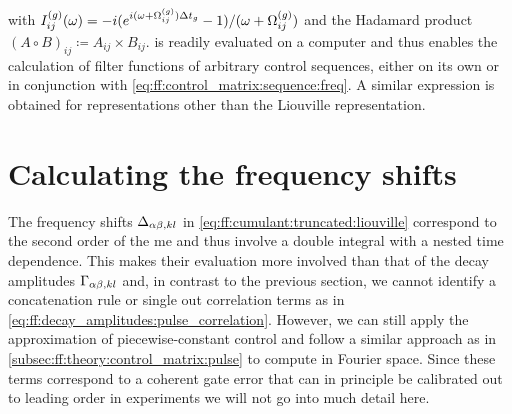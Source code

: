 with $I_{ij}^{(g)}(\omega) = -i(e^{i(\omega + \Omega_{ij}^{(g)})\Delta t_g} - 1)/(\omega + \Omega_{ij}^{(g)})$ and the Hadamard product $(A\circ B)_{ij}\coloneqq A_{ij}\times B_{ij}$.
 is readily evaluated on a computer and thus enables the calculation of filter functions of arbitrary control sequences, either on its own or in conjunction with \cref{eq:ff:control_matrix:sequence:freq}.
A similar expression is obtained for representations other than the Liouville representation.

\section{Calculating the frequency shifts}\label{sec:ff:theory:frequency_shifts}
The frequency shifts $\Delta_{\alpha\beta,kl}$ in \cref{eq:ff:cumulant:truncated:liouville} correspond to the second order of the \gls{me} and thus involve a double integral with a nested time dependence.
This makes their evaluation more involved than that of the decay amplitudes $\Gamma_{\alpha\beta,kl}$ and, in contrast to the previous section, we cannot identify a concatenation rule or single out correlation terms as in \cref{eq:ff:decay_amplitudes:pulse_correlation}.
However, we can still apply the approximation of piecewise-constant control and follow a similar approach as in \cref{subsec:ff:theory:control_matrix:pulse} to compute \freqshifts in Fourier space.
Since these terms correspond to a coherent gate error that can in principle be calibrated out to leading order in experiments we will not go into much detail here.

